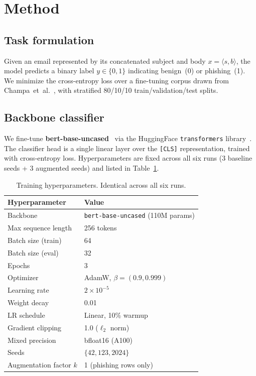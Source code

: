 \documentclass[conference]{IEEEtran}
\begin{document}
\section{Method}
\label{sec:method}

\subsection{Task formulation}
Given an email represented by its concatenated subject and body
$x=\langle s, b \rangle$, the model predicts a binary label
$y\in\{0,1\}$ indicating benign~(0) or phishing~(1). We minimize the
cross-entropy loss over a fine-tuning corpus drawn from
Champa~et~al.~\cite{champa2024curated}, with stratified 80/10/10
train/validation/test splits.

\subsection{Backbone classifier}
We fine-tune \textbf{bert-base-uncased}~\cite{devlin2019bert} via the
HuggingFace \texttt{transformers} library~\cite{wolf2020transformers}.
The classifier head is a single linear layer over the \texttt{[CLS]}
representation, trained with cross-entropy loss. Hyperparameters are
fixed across all six runs (3 baseline seeds + 3 augmented seeds) and
listed in Table~\ref{tab:hp}.

\begin{table}[t]
\caption{Training hyperparameters. Identical across all six runs.}
\label{tab:hp}
\centering
\begin{tabular}{ll}
\toprule
\textbf{Hyperparameter} & \textbf{Value} \\
\midrule
Backbone                & \texttt{bert-base-uncased} (110M params) \\
Max sequence length     & 256 tokens \\
Batch size (train)      & 64 \\
Batch size (eval)       & 32 \\
Epochs                  & 3 \\
Optimizer               & AdamW, $\beta\!=\!(0.9, 0.999)$ \\
Learning rate           & $2\!\times\!10^{-5}$ \\
Weight decay            & 0.01 \\
LR schedule             & Linear, 10\% warmup \\
Gradient clipping       & 1.0 ($\ell_2$ norm) \\
Mixed precision         & bfloat16 (A100) \\
Seeds                   & $\{42, 123, 2024\}$ \\
Augmentation factor $k$ & 1 (phishing rows only) \\
\bottomrule
\end{tabular}
\end{table}
\end{document}
